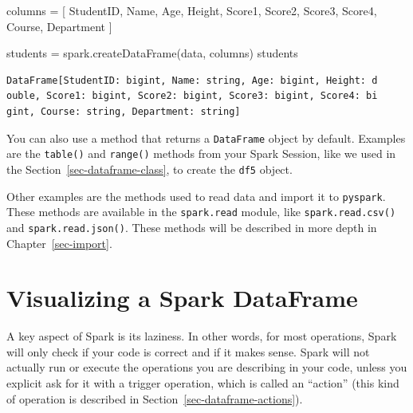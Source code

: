 \documentclass[
  11pt,
  letterpaper,
  DIV=11,
  numbers=noendperiod]{scrreprt}
\newenvironment{Shaded}{\begin{snugshade}}{\end{snugshade}}
\newcommand{\NormalTok}[1]{\textcolor[rgb]{0.00,0.23,0.31}{#1}}
\newcommand{\OperatorTok}[1]{\textcolor[rgb]{0.37,0.37,0.37}{#1}}
\newcommand{\StringTok}[1]{\textcolor[rgb]{0.13,0.47,0.30}{#1}}
\begin{document}
\begin{Shaded}
\begin{Highlighting}[]
\NormalTok{columns }\OperatorTok{=}\NormalTok{ [}
  \StringTok{\textquotesingle{}StudentID\textquotesingle{}}\NormalTok{, }\StringTok{\textquotesingle{}Name\textquotesingle{}}\NormalTok{, }\StringTok{\textquotesingle{}Age\textquotesingle{}}\NormalTok{, }\StringTok{\textquotesingle{}Height\textquotesingle{}}\NormalTok{, }\StringTok{\textquotesingle{}Score1\textquotesingle{}}\NormalTok{,}
  \StringTok{\textquotesingle{}Score2\textquotesingle{}}\NormalTok{, }\StringTok{\textquotesingle{}Score3\textquotesingle{}}\NormalTok{, }\StringTok{\textquotesingle{}Score4\textquotesingle{}}\NormalTok{, }\StringTok{\textquotesingle{}Course\textquotesingle{}}\NormalTok{, }\StringTok{\textquotesingle{}Department\textquotesingle{}}
\NormalTok{]}

\NormalTok{students }\OperatorTok{=}\NormalTok{ spark.createDataFrame(data, columns)}
\NormalTok{students}
\end{Highlighting}
\end{Shaded}

\begin{verbatim}
DataFrame[StudentID: bigint, Name: string, Age: bigint, Height: d
ouble, Score1: bigint, Score2: bigint, Score3: bigint, Score4: bi
gint, Course: string, Department: string]
\end{verbatim}

You can also use a method that returns a \texttt{DataFrame} object by
default. Examples are the \texttt{table()} and \texttt{range()} methods
from your Spark Session, like we used in the
Section~\ref{sec-dataframe-class}, to create the \texttt{df5} object.

Other examples are the methods used to read data and import it to
\texttt{pyspark}. These methods are available in the \texttt{spark.read}
module, like \texttt{spark.read.csv()} and \texttt{spark.read.json()}.
These methods will be described in more depth in
Chapter~\ref{sec-import}.

\section{Visualizing a Spark DataFrame}\label{sec-viewing-a-dataframe}

A key aspect of Spark is its laziness. In other words, for most
operations, Spark will only check if your code is correct and if it
makes sense. Spark will not actually run or execute the operations you
are describing in your code, unless you explicit ask for it with a
trigger operation, which is called an ``action'' (this kind of operation
is described in Section~\ref{sec-dataframe-actions}).
\end{document}
